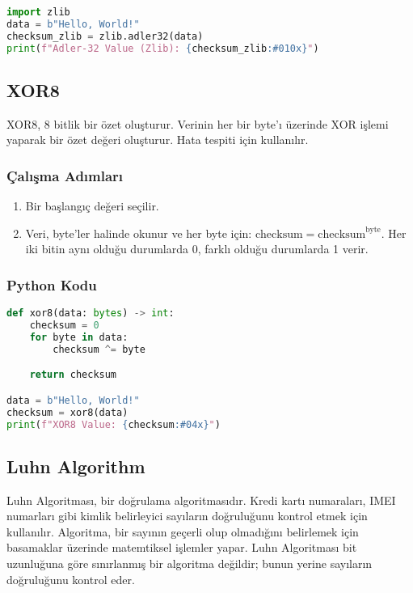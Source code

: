 \begin{lstlisting}[language=Python]
import zlib
data = b"Hello, World!"
checksum_zlib = zlib.adler32(data)
print(f"Adler-32 Value (Zlib): {checksum_zlib:#010x}")
\end{lstlisting}

\newpage

\subsection{XOR8}

XOR8, 8 bitlik bir özet oluşturur. Verinin her bir byte'ı üzerinde XOR işlemi yaparak bir özet değeri oluşturur. Hata tespiti için kullanılır.

\subsubsection{Çalışma Adımları}

\begin{enumerate}
    \item Bir başlangıç değeri seçilir.
    \item Veri, byte'ler halinde okunur ve her byte için: $\text{checksum} = \text{checksum} ^ \text{byte}$. Her iki bitin aynı olduğu durumlarda 0, farklı olduğu durumlarda 1 verir.
\end{enumerate}

\subsubsection{Python Kodu}

\begin{lstlisting}[language=Python]
def xor8(data: bytes) -> int:
    checksum = 0
    for byte in data:
        checksum ^= byte

    return checksum

data = b"Hello, World!"
checksum = xor8(data)
print(f"XOR8 Value: {checksum:#04x}")
\end{lstlisting}

\newpage

\subsection{Luhn Algorithm}

Luhn Algoritması, bir doğrulama algoritmasıdır. Kredi kartı numaraları, IMEI numarları gibi kimlik belirleyici sayıların doğruluğunu kontrol etmek için kullanılır. Algoritma, bir sayının geçerli olup olmadığını belirlemek için basamaklar üzerinde matemtiksel işlemler yapar. Luhn Algoritması bit uzunluğuna göre sınırlanmış bir algoritma değildir; bunun yerine sayıların doğruluğunu kontrol eder.

